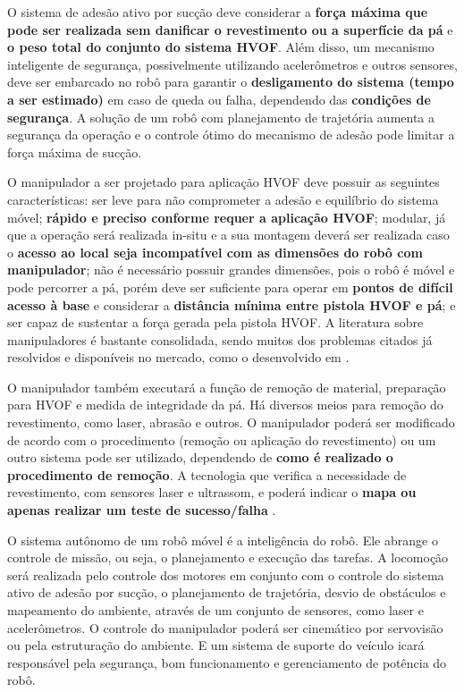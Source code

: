 O sistema de adesão ativo por sucção deve considerar a \textbf{força máxima que
pode ser realizada sem danificar o revestimento ou a superfície da pá} e
\textbf{o peso total do conjunto do sistema HVOF}. Além disso, um mecanismo
inteligente de segurança, possivelmente utilizando acelerômetros e outros
sensores, deve ser embarcado no robô para garantir o \textbf{desligamento do
sistema (tempo a ser estimado)} em caso de queda ou falha, dependendo das
\textbf{condições de segurança}. A solução de um robô com planejamento de
trajetória aumenta a segurança da operação e o controle ótimo do mecanismo de
adesão pode limitar a força máxima de sucção.

O manipulador a ser projetado para aplicação HVOF deve possuir as seguintes
características: ser leve para não comprometer a adesão e equilíbrio do sistema
móvel; \textbf{rápido e preciso conforme requer a aplicação HVOF}; modular, já
que a operação será realizada in-situ e a sua montagem deverá ser realizada
caso o \textbf{acesso ao local seja incompatível com as dimensões do robô com
manipulador}; não é necessário possuir grandes dimensões, pois o robô é móvel e
pode percorrer a pá, porém deve ser suficiente para operar em \textbf{pontos de
difícil acesso à base} e considerar a \textbf{distância mínima entre pistola
HVOF e pá}; e ser capaz de sustentar a força gerada pela pistola HVOF. A
literatura sobre manipuladores é bastante consolidada, sendo muitos dos
problemas citados já resolvidos e disponíveis no mercado, como o desenvolvido
em \cite{manzdevelopment}.

O manipulador também executará a função de remoção de material, preparação para
HVOF e medida de integridade da pá. Há diversos meios para remoção do
revestimento, como laser, abrasão e outros. O manipulador poderá ser modificado
de acordo com o procedimento (remoção ou aplicação do revestimento) ou um outro
sistema pode ser utilizado, dependendo de \textbf{como é realizado o
procedimento de remoção}. A tecnologia que verifica a necessidade de
revestimento, com sensores laser e ultrassom, e poderá indicar o \textbf{mapa
ou apenas realizar um teste de sucesso/falha} \citep{escaler2006detection}.

O sistema autônomo de um robô móvel é a inteligência do robô. Ele abrange o
controle de missão, ou seja, o planejamento e execução das tarefas.
A locomoção será realizada pelo controle dos motores em conjunto com o controle do
sistema ativo de adesão por sucção, o planejamento de trajetória, desvio de
obstáculos e mapeamento do ambiente, através de um conjunto de sensores, como
laser e acelerômetros. O controle do manipulador poderá ser cinemático por
servovisão ou pela estruturação do ambiente. E um sistema de suporte do veículo
icará responsável pela segurança, bom funcionamento e gerenciamento de potência
do robô.

